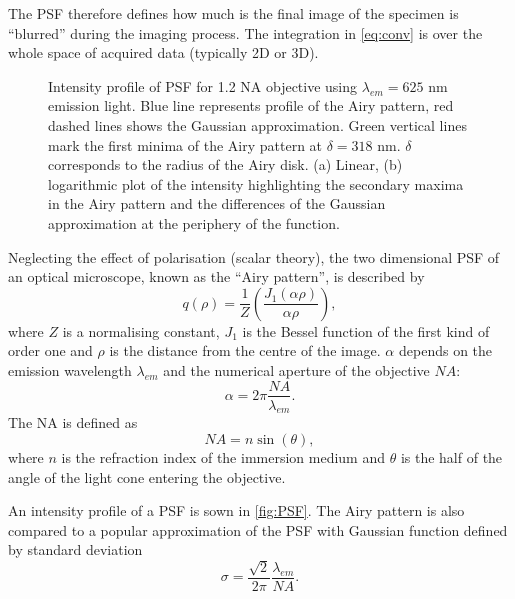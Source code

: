 The PSF therefore defines how much is the final image of the specimen is ``blurred'' during the imaging process. The integration in \autoref{eq:conv} is over the whole space of acquired data (typically 2D or 3D). 

\begin{figure}[!bht]
	\centering
	\newcommand{\wf}{.48\textwidth}
	\caption{Intensity profile of PSF for 1.2 NA objective using $\lambda_{em}=625$ nm emission light. Blue line represents profile of the Airy pattern, red dashed lines shows the Gaussian approximation. Green vertical lines mark the first minima of the Airy pattern at $\delta=318$ nm. $\delta$ corresponds to the radius of the Airy disk. (a) Linear, (b) logarithmic plot of the intensity highlighting the secondary maxima in the Airy pattern and the differences of the Gaussian approximation at the periphery of the function.}
	\label{fig:PSF}
\end{figure}
%
Neglecting the effect of polarisation (scalar theory), the two dimensional PSF of an optical microscope, known as the ``Airy pattern'', is described by
%
\begin{equation}
	q(\rho)=\frac{1}{Z}\left(\frac{J_1(\alpha \rho)}{\alpha \rho}\right),
\end{equation}
%
where $Z$ is a normalising constant, $J_1$ is the Bessel function of the first kind of order one and $\rho$ is the distance from the centre of the image. $\alpha$ depends on the emission wavelength $\lambda_{em}$ and the numerical aperture of the objective $\unit{NA}$:
%
\begin{equation}
	\alpha=2\pi\frac{\unit{NA}}{\lambda_{em}}.
\end{equation}
% 
The NA is defined as
\begin{equation}
	\unit{NA}=n\sin(\theta),
\end{equation}
%
where $n$ is the refraction index of the immersion medium and $\theta$ is the half of the angle of the light cone entering the objective.

An intensity profile of a PSF is sown in \autoref{fig:PSF}. The Airy pattern is also compared to a popular approximation of the PSF with Gaussian function \cite{Zhang2007} defined by standard deviation
%
\begin{equation}
	\sigma=\frac{\sqrt{2}}{2\pi}\frac{\lambda_{em}}{\unit{NA}}.
\end{equation}


